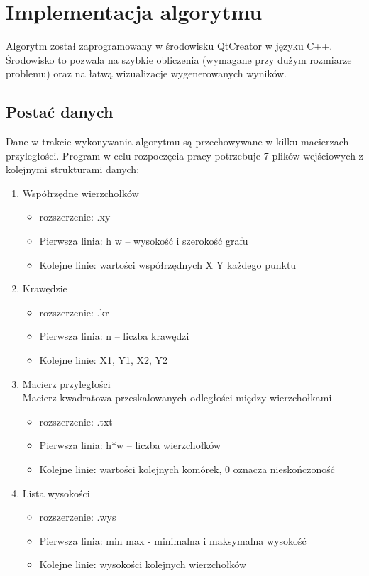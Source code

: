 \documentclass[12pt,a4paper]{article}
\begin{document}
\section{Implementacja algorytmu}
Algorytm został zaprogramowany w środowisku QtCreator w języku C++. Środowisko to pozwala na szybkie obliczenia (wymagane przy dużym rozmiarze problemu) oraz na łatwą wizualizacje wygenerowanych wyników.
\subsection{Postać danych}
Dane w trakcie wykonywania algorytmu są przechowywane w kilku macierzach przyległości. Program w celu rozpoczęcia pracy potrzebuje 7 plików wejściowych z kolejnymi strukturami danych:
\begin{enumerate}
\item Współrzędne wierzchołków
	\begin{itemize}
	\item rozszerzenie: .xy
	\item Pierwsza linia: h w -- wysokość i szerokość grafu
	\item Kolejne linie: wartości współrzędnych X Y każdego punktu
	\end{itemize}
\item Krawędzie
	\begin{itemize}
	\item rozszerzenie: .kr
	\item Pierwsza linia: n -- liczba krawędzi
	\item Kolejne linie: X1, Y1, X2, Y2
	\end{itemize}
\item Macierz przyległości\\
Macierz kwadratowa przeskalowanych odległości między wierzchołkami
	\begin{itemize}
	\item rozszerzenie: .txt
	\item Pierwsza linia: h*w -- liczba wierzchołków
	\item Kolejne linie: wartości kolejnych komórek, 0 oznacza nieskończoność
	\end{itemize}
\item Lista wysokości
	\begin{itemize}
	\item rozszerzenie: .wys
	\item Pierwsza linia: min max - minimalna i maksymalna wysokość
	\item Kolejne linie: wysokości kolejnych wierzchołków

\end{itemize}
\end{enumerate}
\end{document}
